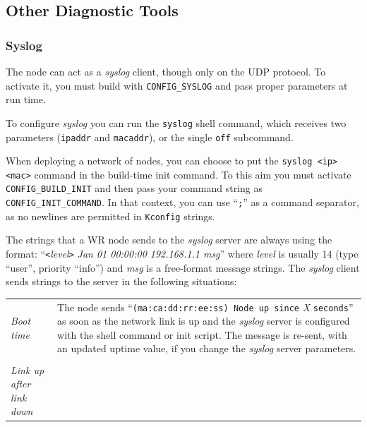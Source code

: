 \documentclass[a4paper, 12pt]{article}
\begin{document}
\subsection{Other Diagnostic Tools}
\label{Other Diagnostic Tools}

\subsubsection{Syslog}
\label{Syslog}

\begin{sloppypar} %
The node can act as a \textit{syslog} client, though only on the UDP protocol.
To activate it, you must build with \texttt{CONFIG\_SYSLOG} and pass proper
parameters at run time.

To configure \textit{syslog} you can run the \texttt{syslog} shell command, which
receives two parameters (\texttt{ipaddr} and \texttt{macaddr}), or the
single \texttt{off} subcommand.

When deploying a network of nodes, you can choose to put the \texttt{syslog
<ip> <mac>} command in the build-time init command. To this aim you
must activate \texttt{CONFIG\_BUILD\_INIT} and then pass your command string
as \texttt{CONFIG\_INIT\_COMMAND}.  In that context, you can use ``\texttt{;}'' as
a command separator, as no newlines are permitted in \texttt{Kconfig}
strings.

The strings that a WR node sends to the \textit{syslog} server are always
using the format:  ``\texttt{<}\textit{level}\texttt{>} \textit{Jan 01 00:00:00 192.168.1.1 msg}''
where \textit{level} is usually 14 (type ``user'', priority ``info'')
and \textit{msg} is a free-format message strings.
The \textit{syslog} client sends strings to the server in the following
situations:
\begin{longtable}{  p{6.5cm}  p{9cm} }

\textit{ Boot time } &

	The node sends ``\texttt{(ma:ca:dd:rr:ee:ss) Node up since} \textit{X}
        \texttt{seconds}'' as soon as the network link is up and the \textit{syslog}
        server is configured with the shell command or init script.
        The message is re-sent, with an updated uptime value, if you change
        the \textit{syslog} server parameters. \\
& \\
\textit{ Link up after link down } &


\end{longtable}
\end{sloppypar}
\end{document}
